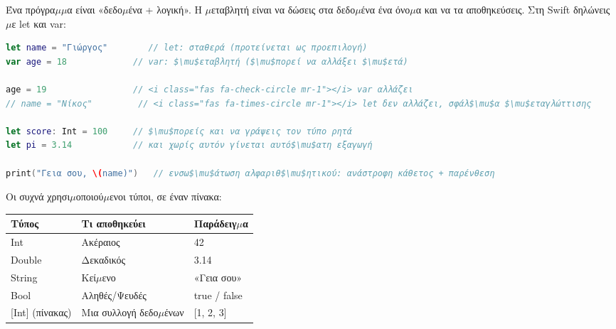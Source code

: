 


Ένα πρόγρα$\mu$$\mu$α είναι «δεδο$\mu$ένα + λογική». Η $\mu$εταβλητή είναι να δώσεις στα δεδο$\mu$ένα ένα όνο$\mu$α και να τα αποθηκεύσεις. Στη Swift δηλώνεις $\mu$ε let και var:

\begin{lstlisting}[language=Swift]
let name = "Γιώργος"        // let: σταθερά (προτείνεται ως προεπιλογή)
var age = 18             // var: $\mu$εταβλητή ($\mu$πορεί να αλλάξει $\mu$ετά)

age = 19                 // <i class="fas fa-check-circle mr-1"></i> var αλλάζει
// name = "Νίκος"         // <i class="fas fa-times-circle mr-1"></i> let δεν αλλάζει, σφάλ$\mu$α $\mu$εταγλώττισης

let score: Int = 100     // $\mu$πορείς και να γράψεις τον τύπο ρητά
let pi = 3.14            // και χωρίς αυτόν γίνεται αυτό$\mu$ατη εξαγωγή

print("Γεια σου, \(name)")   // ενσω$\mu$άτωση αλφαριθ$\mu$ητικού: ανάστροφη κάθετος + παρένθεση
\end{lstlisting}

Οι συχνά χρησι$\mu$οποιού$\mu$ενοι τύποι, σε έναν πίνακα:

\begin{center}
\begin{tabularx}{\linewidth}{|X|X|X|}
\hline
\textbf{Τύπος} & \textbf{Τι αποθηκεύει} & \textbf{Παράδειγ$\mu$α} \tabularnewline
\hline
Int & Ακέραιος & 42 \tabularnewline
Double & Δεκαδικός & 3.14 \tabularnewline
String & Κεί$\mu$ενο & «Γεια σου» \tabularnewline
Bool & Αληθές/Ψευδές & true / false \tabularnewline
{}[Int] (πίνακας) & Μια συλλογή δεδο$\mu$ένων & {}[1, 2, 3] \tabularnewline
\hline
\end{tabularx}
\end{center}

